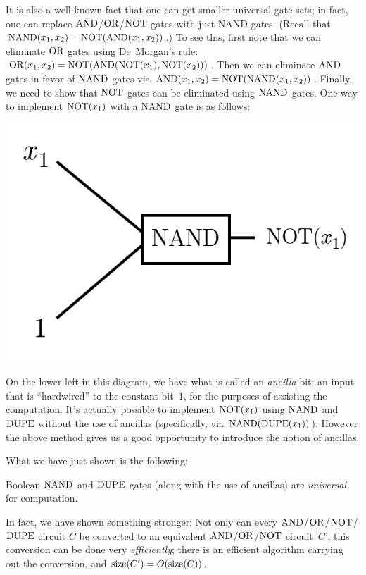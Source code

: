 \documentclass[12pt]{article}
\begin{document}
It is also a well known fact that one can get smaller universal gate sets; in fact, one can replace $\AND$/$\OR$/$\NOT$ gates with just NAND gates.  (Recall that $\NAND(x_1,x_2) = \NOT(\AND(x_1,x_2))$.)  To see this, first note that we can eliminate $\OR$ gates using De~Morgan's rule: $\OR(x_1, x_2) = \NOT(\AND(\NOT(x_1),\NOT(x_2)))$. Then we can eliminate $\AND$ gates in favor of $\NAND$ gates via $\AND(x_1,x_2) = \NOT(\NAND(x_1, x_2))$.  Finally, we need to show that $\NOT$ gates can be eliminated using $\NAND$ gates.  One way to implement $\NOT(x_1)$ with a $\NAND$ gate is as follows:
\begin{center}
        \includegraphics[scale=.5]{lecture01-figure3.png}
\end{center}
On the lower left in this diagram, we have what is called an \emph{ancilla} bit: an input that is ``hardwired'' to the constant bit~$1$, for the purposes of assisting the computation.  It's actually possible to implement $\NOT(x_1)$ using $\NAND$ and $\DUPE$ without the use of ancillas (specifically, via $\NAND(\DUPE(x_1))$).  However the above method gives us a good opportunity to introduce the notion of ancillas.

What we have just shown is the following:
\begin{proposition}                                     \label{prop:universal2}
    Boolean $\NAND$ and $\DUPE$ gates (along with the use of ancillas) are \emph{universal} for computation.
\end{proposition}
\begin{remark}
    In fact, we have shown something stronger: Not only can every $\AND$/$\OR$/$\NOT$/$\DUPE$ circuit $C$ be converted to an equivalent $\AND$/$\OR$/$\NOT$ circuit~$C$', this conversion can be done very \emph{efficiently}; there is an efficient algorithm carrying out the conversion, and $\size(C') = O(\size(C))$.
\end{remark}
\end{document}
